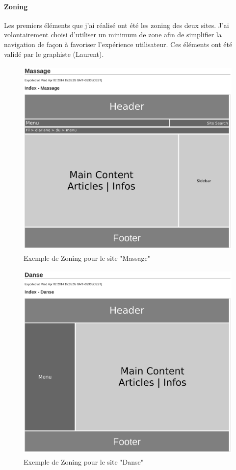 \documentclass[11pt,a4paper]{report}
\begin{document}
			\paragraph*{Zoning}Les premiers éléments que j'ai réalisé ont été les zoning des deux sites. J'ai volontairement choisi d'utiliser un minimum de zone afin de simplifier la navigation de façon à favoriser l'expérience utilisateur. Ces éléments ont été validé par le graphiste (Laurent).
				\begin{figure}[H]
					\centering
					\includegraphics[height=10cm]{Zone-Massage.eps}
					\caption{Exemple de Zoning pour le site "Massage"}
					\label{fig:Zoning Massage}
				\end{figure}
				\begin{figure}[H]
					\centering
					\includegraphics[height=10cm]{Zone-Danse.eps}
					\caption{Exemple de Zoning pour le site "Danse"}
					\label{fig:Zoning Danse}
				\end{figure}
\end{document}
